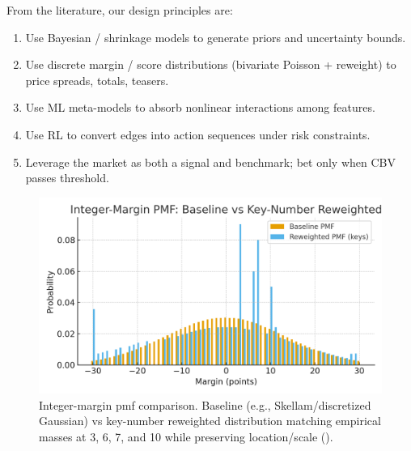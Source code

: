 From the literature, our design principles are:
\begin{enumerate}
  \item Use Bayesian / shrinkage models to generate priors and uncertainty bounds.
  \item Use discrete margin / score distributions (bivariate Poisson + reweight) to price spreads, totals, teasers.
  \item Use ML meta-models to absorb nonlinear interactions among features.
  \item Use RL to convert edges into action sequences under risk constraints.
  \item Leverage the market as both a signal and benchmark; bet only when CBV passes threshold.
\end{enumerate}

\bigskip
\begin{figure}[t]
  \centering
  \includegraphics[width=\linewidth]{../figures/key_number_pmf.png}
  \caption{Integer-margin pmf comparison. Baseline (e.g., Skellam/discretized Gaussian) vs key-number reweighted distribution matching empirical masses at 3, 6, 7, and 10 while preserving location/scale ().}
  \label{fig:key-pmf}
\end{figure}

